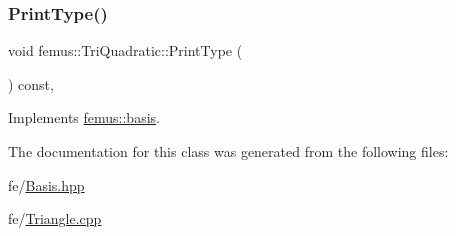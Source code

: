 \subsubsection{\texorpdfstring{Print\+Type()}{PrintType()}}
{\footnotesize\ttfamily void femus\+::\+Tri\+Quadratic\+::\+Print\+Type (\begin{DoxyParamCaption}{ }\end{DoxyParamCaption}) const\hspace{0.3cm}{\ttfamily [inline]}, {\ttfamily [virtual]}}



Implements \mbox{\hyperlink{classfemus_1_1basis_abbae7bf8f31ec5793c911bc6d4ea0572}{femus\+::basis}}.



The documentation for this class was generated from the following files\+:\begin{DoxyCompactItemize}
\item 
fe/\mbox{\hyperlink{_basis_8hpp}{Basis.\+hpp}}\item 
fe/\mbox{\hyperlink{_triangle_8cpp}{Triangle.\+cpp}}\end{DoxyCompactItemize}
